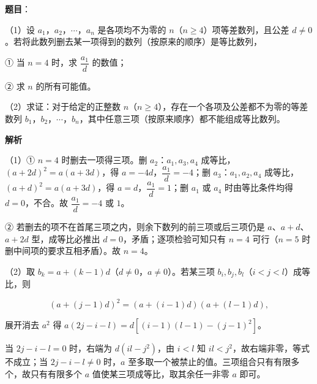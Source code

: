 \begin{answer}

\textbf{题目}：

（1）设 $a_1$，$a_2$，$\cdots$，$a_n$ 是各项均不为零的 $n$（$n\geqslant4$）项等差数列，且公差 $d\neq0$。若将此数列删去某一项得到的数列（按原来的顺序）是等比数列，

① 当 $n=4$ 时，求 $\dfrac{a_1}d$ 的数值；

② 求 $n$ 的所有可能值。

（2）求证：对于给定的正整数 $n$（$n\geqslant4$），存在一个各项及公差都不为零的等差数列 $b_1$，$b_2$，$\cdots$，$b_n$，其中任意三项（按原来顺序）都不能组成等比数列。

\textbf{解析}

（1）① $n=4$ 时删去一项得三项。删 $a_2$：$a_1,a_3,a_4$ 成等比，$(a+2d)^2=a(a+3d)$，得 $a=-4d$，$\dfrac{a_1}d=-4$；删 $a_3$：$a_1,a_2,a_4$ 成等比，$(a+d)^2=a(a+3d)$，得 $a=d$，$\dfrac{a_1}d=1$；删 $a_1$ 或 $a_4$ 时由等比条件均得 $d=0$，不合。故 $\dfrac{a_1}d=-4$ 或 $1$。

② 若删去的项不在首尾三项之内，则余下数列的前三项或后三项仍是 $a$、$a+d$、$a+2d$ 型，成等比必推出 $d=0$，矛盾；逐项检验可知只有 $n=4$ 可行（$n=5$ 时删中间项的要求互相矛盾）。故 $n=4$。

（2）取 $b_k=a+(k-1)d$（$d\neq0$，$a\neq0$）。若某三项 $b_i,b_j,b_l$（$i<j<l$）成等比，则

\nopagebreak[4]
\[(a+(j-1)d)^2=(a+(i-1)d)(a+(l-1)d),\]

展开消去 $a^2$ 得 $a(2j-i-l)=d\left[(i-1)(l-1)-(j-1)^2\right]$。

当 $2j-i-l=0$ 时，右端为 $d(il-j^2)$，由 $i<l$ 知 $il<j^2$，故右端非零，等式不成立；当 $2j-i-l\neq0$ 时，$a$ 至多取一个被禁止的值。三项组合只有有限多个，故只有有限多个 $a$ 值使某三项成等比，取其余任一非零 $a$ 即可。


\end{answer}
